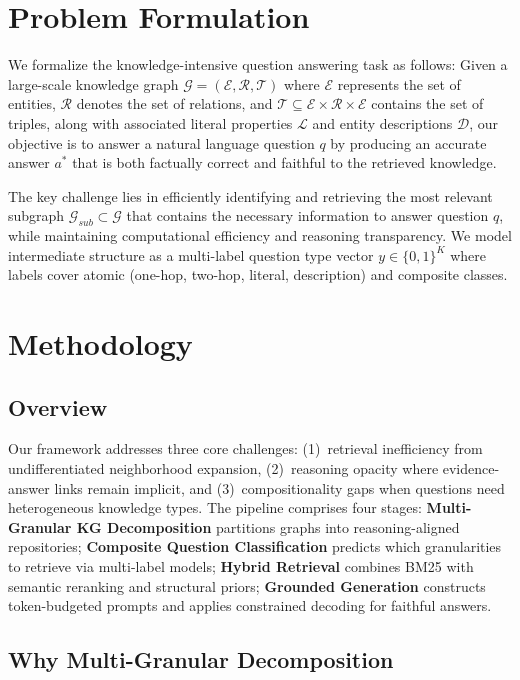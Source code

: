 \documentclass[conference]{IEEEtran}
\begin{document}
\section{Problem Formulation}

We formalize the knowledge-intensive question answering task as follows: Given a large-scale knowledge graph $\mathcal{G} = (\mathcal{E}, \mathcal{R}, \mathcal{T})$ where $\mathcal{E}$ represents the set of entities, $\mathcal{R}$ denotes the set of relations, and $\mathcal{T} \subseteq \mathcal{E} \times \mathcal{R} \times \mathcal{E}$ contains the set of triples, along with associated literal properties $\mathcal{L}$ and entity descriptions $\mathcal{D}$, our objective is to answer a natural language question $q$ by producing an accurate answer $a^*$ that is both factually correct and faithful to the retrieved knowledge.

The key challenge lies in efficiently identifying and retrieving the most relevant subgraph $\mathcal{G}_{sub} \subset \mathcal{G}$ that contains the necessary information to answer question $q$, while maintaining computational efficiency and reasoning transparency. We model intermediate structure as a multi-label question type vector $y \in \{0,1\}^K$ where labels cover atomic (one-hop, two-hop, literal, description) and composite classes.

\section{Methodology}

\subsection{Overview}

Our framework addresses three core challenges: (1)~retrieval inefficiency from undifferentiated neighborhood expansion, (2)~reasoning opacity where evidence-answer links remain implicit, and (3)~compositionality gaps when questions need heterogeneous knowledge types. The pipeline comprises four stages: \textbf{Multi-Granular KG Decomposition} partitions graphs into reasoning-aligned repositories; \textbf{Composite Question Classification} predicts which granularities to retrieve via multi-label models; \textbf{Hybrid Retrieval} combines BM25 with semantic reranking and structural priors; \textbf{Grounded Generation} constructs token-budgeted prompts and applies constrained decoding for faithful answers.

\subsection{Why Multi-Granular Decomposition}
\end{document}
